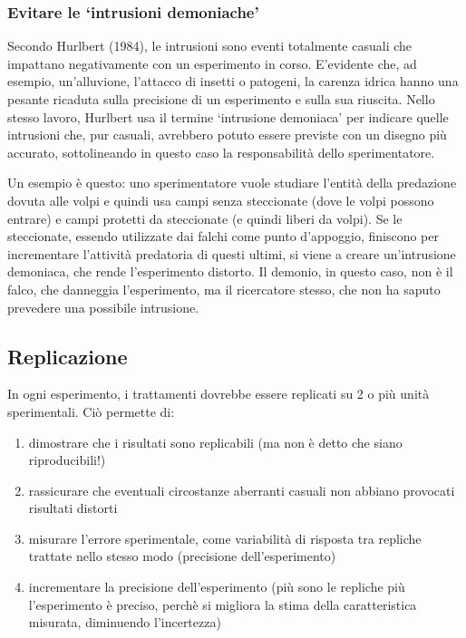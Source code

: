 \documentclass[a4paper,12pt,oneside]{book}
\providecommand{\tightlist}{%
  \setlength{\itemsep}{0pt}\setlength{\parskip}{0pt}}
\begin{document}
\subsubsection{\texorpdfstring{Evitare le `intrusioni
demoniache'}{Evitare le intrusioni demoniache}}\label{evitare-le-intrusioni-demoniache}

Secondo Hurlbert (1984), le intrusioni sono eventi totalmente casuali
che impattano negativamente con un esperimento in corso. E'evidente che,
ad esempio, un'alluvione, l'attacco di insetti o patogeni, la carenza
idrica hanno una pesante ricaduta sulla precisione di un esperimento e
sulla sua riuscita. Nello stesso lavoro, Hurlbert usa il termine
`intrusione demoniaca' per indicare quelle intrusioni che, pur casuali,
avrebbero potuto essere previste con un disegno più accurato,
sottolineando in questo caso la responsabilità dello sperimentatore.

Un esempio è questo: uno sperimentatore vuole studiare l'entità della
predazione dovuta alle volpi e quindi usa campi senza steccionate (dove
le volpi possono entrare) e campi protetti da steccionate (e quindi
liberi da volpi). Se le steccionate, essendo utilizzate dai falchi come
punto d'appoggio, finiscono per incrementare l'attività predatoria di
questi ultimi, si viene a creare un'intrusione demoniaca, che rende
l'esperimento distorto. Il demonio, in questo caso, non è il falco, che
danneggia l'esperimento, ma il ricercatore stesso, che non ha saputo
prevedere una possibile intrusione.

\subsection{Replicazione}\label{replicazione}

In ogni esperimento, i trattamenti dovrebbe essere replicati su 2 o più
unità sperimentali. Ciò permette di:

\begin{enumerate}
\def\labelenumi{\arabic{enumi}.}
\tightlist
\item
  dimostrare che i risultati sono replicabili (ma non è detto che siano
  riproducibili!)
\item
  rassicurare che eventuali circostanze aberranti casuali non abbiano
  provocati risultati distorti
\item
  misurare l'errore sperimentale, come variabilità di risposta tra
  repliche trattate nello stesso modo (precisione dell'esperimento)
\item
  incrementare la precisione dell'esperimento (più sono le repliche più
  l'esperimento è preciso, perchè si migliora la stima della
  caratteristica misurata, diminuendo l'incertezza)
\end{enumerate}
\end{document}
